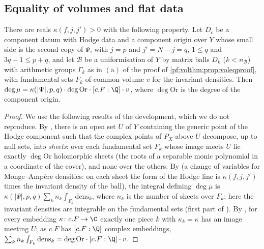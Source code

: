 \subsection{Equality of volumes and flat data}\label{pf:volthm:sec:voleq}

\begin{lemma}\label{pf:volthm:lem:degmu}
There are reals $\kappa(f,j,j')>0$ with the following property. Let $D_c$ be a component datum with Hodge data and a
component origin over $Y$ whose small side is the second copy of $\Psi$, with $j=p$ and $j'=N-j=q$, $1\le q$ and
$3q+1\le p+q$, and let $\mathcal B$ be a uniformisation of $Y$ by matrix balls $D_k$ ($k<n_{\mathcal B}$) with arithmetic
groups $\Gamma_k$ as in $(\mathrm{a})$ of the proof of \cref{pf:volthm:prop:voleqproof}, with fundamental sets $F_k$ of
common volume $v$ for the invariant densities. Then
$\deg\mu=\kappa(|\Psi|,p,q)\cdot\deg\mathrm{Or}\cdot[c.F:\Q]\cdot v$, where $\deg\mathrm{Or}$ is the degree of the
component origin.
\end{lemma}

\begin{proof}
We use the following results of the development, which we do not reproduce. By
, there is an open set $U$ of $Y$ containing the generic point of the Hodge
component such that the complex points of $P_X$ above $U$ decompose, up to null sets, into \emph{sheets}: over each
fundamental set $F_k$ whose image meets $U$ lie exactly $\deg\mathrm{Or}$ holomorphic sheets (the roots of a separable
monic polynomial in a coordinate of the cover), and none over the others. By
 (a change of variables for Monge--Amp\`ere densities: on each sheet the form of
the Hodge line is $\kappa(f,j,j')$ times the invariant density of the ball), the integral defining $\deg\mu$ is
$\kappa(|\Psi|,p,q)\sum_k n_k\int_{F_k}\mathrm{dens}_k$, where $n_k$ is the number of sheets over $F_k$; here the
invariant densities are integrable on the fundamental sets (first part of
). By
, for every embedding $\kappa\colon c.F\to\C$ exactly one piece $k$ with $\kappa_k=\kappa$
has an image meeting $U$; as $c.F$ has $[c.F:\Q]$ complex embeddings, $\sum_kn_k\int_{F_k}\mathrm{dens}_k=
\deg\mathrm{Or}\cdot[c.F:\Q]\cdot v$.
\end{proof}

